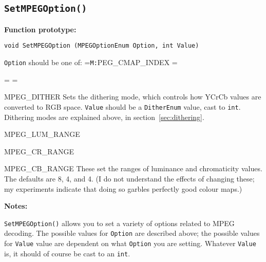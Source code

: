 \documentclass[11pt]{article}
\newcommand{\code}[1]{\texttt{#1}}
\newcommand{\ttlabel}[1]{\texttt{#1:}\quad\hfil}
\newenvironment{ttdescription}[1] {\newbox\holder
  \setbox\holder=\hbox{\ttlabel#1} \dimen0=\wd\holder
 \begin{list}{}
   {\labelsep=-0.25in \rightmargin=0.25in \leftmargin=\dimen0
     \addtolength{\leftmargin}{0.25in}
  \labelwidth=\leftmargin
  \let\makelabel\ttlabel}}%
{\end{list}}
\newcommand{\prototype}[1]{%
  \textbf{Function prototype:}\par \smallskip \code{#1}\par\medskip }
\newenvironment{Notes}{%
\noindent\textbf{Notes:}\par\smallskip}
{\medskip}
\begin{document}
\subsection{\code{SetMPEGOption()}}
\prototype{void SetMPEGOption (MPEGOptionEnum Option, int Value)}
\noindent\code{Option} should be one of:
  \begin{ttdescription}{MPEG\_CMAP\_INDEX}
  \item[MPEG\_DITHER] Sets the dithering mode, which controls how YCrCb
    values are converted to RGB space.  \code{Value} should be a
    \code{DitherEnum} value, cast to \code{int}.  Dithering modes are
    explained above, in section~\ref{sec:dithering}.

  \item[MPEG\_LUM\_RANGE]
  \item[MPEG\_CR\_RANGE]
  \item[MPEG\_CB\_RANGE] These set the ranges of luminance and
    chromaticity values.  The defaults are 8, 4, and 4.  (I do
    not understand the effects of changing these; my experiments
    indicate that doing so garbles perfectly good colour maps.)


  \end{ttdescription}

\begin{Notes}
  \code{SetMPEGOption()} allows you to set a variety of options related
  to MPEG decoding.  The possible values for \code{Option} are described
  above; the possible values for \code{Value} value are dependent on
  what \code{Option} you are setting.  Whatever \code{Value} is, it
  should of course be cast to an \code{int}.
\end{Notes}
\end{document}
